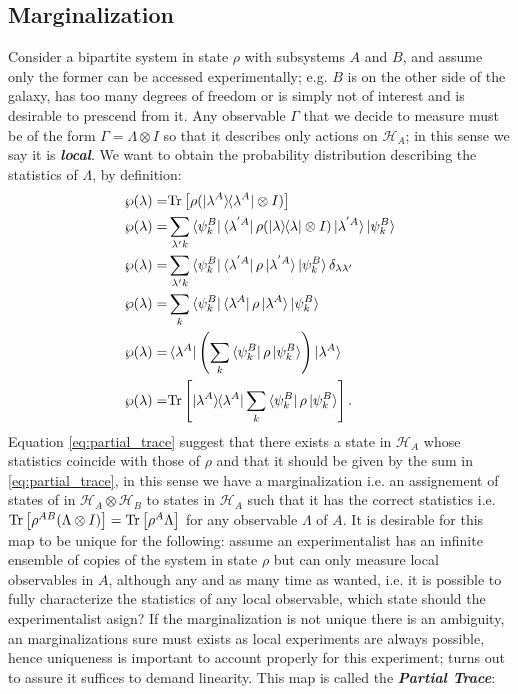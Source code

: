 \subsection{Marginalization}
Consider a bipartite system in state $\rho$ with subsystems $A$ and $B$, and assume only the former can be accessed
experimentally; e.g. $B$ is on the other side of the galaxy, has too many degrees of freedom or is simply not of interest and is desirable
to prescend from it. Any
observable $\Gamma$ that we decide to measure must be of the form $\Gamma=\Lambda \otimes I$ so that it describes only actions on
$\mathcal{H}_{A}$; in this sense we say it is \textit{\textbf{local}}. We want to obtain the probability distribution describing the statistics
of $\Lambda$, by definition:
 \begin{align}
   \wp(\lambda)=&\Tr{\rho (\ketbra{\lambda^{A}}\otimes I)}\\
   \wp(\lambda)=& \sum_{\lambda'k}\bra{\psi_{k}^{B}}\bra{\lambda^{'A}}\rho (\ketbra{\lambda}\otimes I)\ket{\lambda^{'A}}\ket{\psi_{k}^{B}}\\
    \wp(\lambda)=& \sum_{\lambda'k}\bra{\psi_{k}^{B}}\bra{\lambda^{'A}}\rho \ket{\lambda^{'A}}\ket{\psi_{k}^{B}} \delta_{\lambda\lambda'}\\
    \wp(\lambda)=& \sum_{k}\bra{\psi_{k}^{B}}\bra{\lambda^{A}}\rho \ket{\lambda^{A}}\ket{\psi_{k}^{B}} \\
    \wp(\lambda)=& \bra{\lambda^{A}} \left(\sum_{k}\bra{\psi_{k}^{B}}\rho\ket{\psi_{k}^{B}}\right)\ket{\lambda^{A}}\\
    \wp(\lambda)=& \Tr{\ketbra{\lambda^{A}}\sum_{k}\bra{\psi_{k}^{B}}\rho\ket{\psi_{k}^{B}}} \label{eq:partial_trace}.
 \end{align}
Equation \eqref{eq:partial_trace} suggest that there exists a state in $\mathcal{H}_{A}$ whose statistics  coincide
with those of $\rho$ and that it should be given by the sum in \eqref{eq:partial_trace}, in this sense we have a marginalization i.e.
an assignement of states of in $\mathcal{H}_{A}\otimes\mathcal{H}_{B}$ to states in $\mathcal{H}_{A}$ such that it has the correct statistics
i.e. $\mathrm{Tr}\left[\rho^{AB}(\Lambda \otimes I)\right]=\mathrm{Tr}\left[\rho^{A}\Lambda\right]$ for any observable $\Lambda$ of $A$. It is desirable for this map to be unique
for the following: assume an experimentalist has an infinite ensemble of copies of the system in state $\rho$ but can only measure local
observables in $A$, although any and as many time as wanted, i.e. it is possible to fully characterize the statistics of any local observable,
which state should the experimentalist asign? If the marginalization is not unique there is an ambiguity, an marginalizations sure must
exists as local experiments are always possible, hence uniqueness is important to account properly for this experiment; turns out to
assure it suffices to demand linearity. This map is called the \textit{\textbf{Partial Trace}}:

